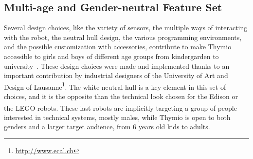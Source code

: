 \documentclass[letterpaper, 10 pt, conference]{ieeeconf}  %
\begin{document}

\subsection{Multi-age and Gender-neutral Feature Set}
\label{sec:multi}

Several design choices, like the variety of sensors, the multiple ways of interacting with the robot, the neutral hull design, the various programming environments, and the possible customization with accessories, contribute to make Thymio accessible to girls and boys of different age groups from kindergarden to university~\cite{Riedo2013}.
These design choices were made and implemented thanks to an important contribution by industrial designers of the University of Art and Design of Lausanne\footnote{\url{http://www.ecal.ch}}.
The white neutral hull is a key element in this set of choices, and it is the opposite than the technical look chosen for the Edison or the LEGO\textsuperscript{\textregistered} robots. 
These last robots are implicitly targeting a group of people interested in technical systems, mostly males, while Thymio is open to both genders and a larger target audience, from 6 years old kids to adults.
\end{document}
